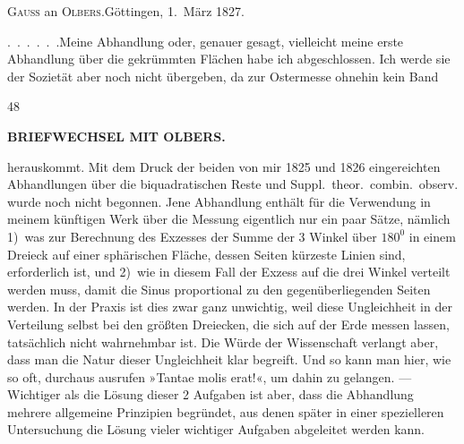 \begin{center}
\textsc{Gauss} an \textsc{Olbers}.\quad Göttingen, 1.~März 1827.
\end{center}

\par\noindent\hspace*{\parindent}\mbox{.\ .\ .\ .\ .\ .}\quad Meine Abhandlung oder, genauer gesagt, vielleicht meine erste Abhandlung über die gekrümmten Flächen habe ich abgeschlossen. Ich werde sie der Sozietät aber noch nicht übergeben, da zur Ostermesse ohnehin kein Band
\par\smallskip\noindent{}\hfill{\footnotesize48}\hspace*{0.14\linewidth}\par
\clearpage
\noindent{}\hfill{\small\textbf{BRIEFWECHSEL MIT OLBERS.}}\hfill\null\par\medskip
\noindent herauskommt.
Mit dem Druck der beiden von mir 1825 und 1826 eingereichten Abhandlungen über die biquadratischen Reste und Suppl.\ theor.\ combin.\ observ. wurde noch nicht begonnen.
Jene Abhandlung enthält für die  Verwendung in meinem künftigen Werk über die Messung eigentlich nur ein paar Sätze, nämlich 1)~was zur Berechnung des Exzesses der Summe der 3 Winkel über \(180^{0}\) in einem Dreieck auf einer  sphärischen Fläche, dessen Seiten kürzeste Linien sind, erforderlich ist, und 2)~wie in diesem Fall der Exzess  auf die drei Winkel verteilt werden muss, damit die Sinus proportional zu den gegenüberliegenden Seiten werden.
In der Praxis ist dies zwar ganz unwichtig, weil diese Ungleichheit in der Verteilung selbst bei den größten Dreiecken, die sich auf der Erde messen lassen, tatsächlich nicht wahrnehmbar ist. Die Würde der Wissenschaft verlangt aber, dass man die Natur dieser Ungleichheit klar begreift.
Und so kann man hier, wie so oft, durchaus ausrufen »Tantae molis erat!«, um dahin zu gelangen. ---
Wichtiger als die Lösung dieser 2 Aufgaben ist aber, dass die Abhandlung mehrere allgemeine Prinzipien begründet, aus denen später in einer spezielleren Untersuchung die Lösung vieler wichtiger Aufgaben abgeleitet werden kann.

